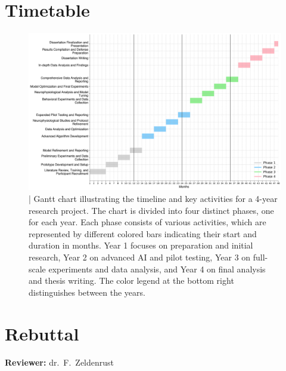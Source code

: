 \documentclass[10pt]{article}
\begin{document}
\section*{Timetable}\label{sec:timetable}
\begin{figure}[ht!]
  \centering
  \includegraphics[width=1.0\textwidth]{imgs/Gannt_chart.png}
  \caption{| Gantt chart illustrating the timeline and key activities for a 4-year research project. The chart is divided into four distinct phases, one for each year. Each phase consists of various activities, which are represented by different colored bars indicating their start and duration in months. Year 1 focuses on preparation and initial research, Year 2 on advanced AI and pilot testing, Year 3 on full-scale experiments and data analysis, and Year 4 on final analysis and thesis writing. The color legend at the bottom right distinguishes between the years.}\label{fig:gannt_chart}
\end{figure}

\printbibliography%

\section*{Rebuttal}\label{sec:rebuttal}
\noindent \textbf{Reviewer:} dr.\ F.\ Zeldenrust\\
\end{document}
